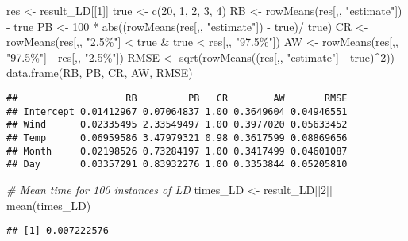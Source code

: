 \documentclass[
]{article}
\newenvironment{Shaded}{\begin{snugshade}}{\end{snugshade}}
\newcommand{\CommentTok}[1]{\textcolor[rgb]{0.56,0.35,0.01}{\textit{#1}}}
\newcommand{\DecValTok}[1]{\textcolor[rgb]{0.00,0.00,0.81}{#1}}
\newcommand{\FunctionTok}[1]{\textcolor[rgb]{0.00,0.00,0.00}{#1}}
\newcommand{\NormalTok}[1]{#1}
\newcommand{\OtherTok}[1]{\textcolor[rgb]{0.56,0.35,0.01}{#1}}
\newcommand{\SpecialCharTok}[1]{\textcolor[rgb]{0.00,0.00,0.00}{#1}}
\newcommand{\StringTok}[1]{\textcolor[rgb]{0.31,0.60,0.02}{#1}}
\begin{document}
\begin{Shaded}
\begin{Highlighting}[]
\NormalTok{res }\OtherTok{\textless{}{-}}\NormalTok{ result\_LD[[}\DecValTok{1}\NormalTok{]]}
\NormalTok{true }\OtherTok{\textless{}{-}} \FunctionTok{c}\NormalTok{(}\DecValTok{20}\NormalTok{, }\DecValTok{1}\NormalTok{, }\DecValTok{2}\NormalTok{, }\DecValTok{3}\NormalTok{, }\DecValTok{4}\NormalTok{)}
\NormalTok{RB }\OtherTok{\textless{}{-}} \FunctionTok{rowMeans}\NormalTok{(res[,, }\StringTok{"estimate"}\NormalTok{]) }\SpecialCharTok{{-}}\NormalTok{ true}
\NormalTok{PB }\OtherTok{\textless{}{-}} \DecValTok{100} \SpecialCharTok{*} \FunctionTok{abs}\NormalTok{((}\FunctionTok{rowMeans}\NormalTok{(res[,, }\StringTok{"estimate"}\NormalTok{]) }\SpecialCharTok{{-}}\NormalTok{ true)}\SpecialCharTok{/}\NormalTok{ true)}
\NormalTok{CR }\OtherTok{\textless{}{-}} \FunctionTok{rowMeans}\NormalTok{(res[,, }\StringTok{"2.5\%"}\NormalTok{] }\SpecialCharTok{\textless{}}\NormalTok{ true }\SpecialCharTok{\&}\NormalTok{ true }\SpecialCharTok{\textless{}}\NormalTok{ res[,, }\StringTok{"97.5\%"}\NormalTok{])}
\NormalTok{AW }\OtherTok{\textless{}{-}} \FunctionTok{rowMeans}\NormalTok{(res[,, }\StringTok{"97.5\%"}\NormalTok{] }\SpecialCharTok{{-}}\NormalTok{ res[,, }\StringTok{"2.5\%"}\NormalTok{])}
\NormalTok{RMSE }\OtherTok{\textless{}{-}} \FunctionTok{sqrt}\NormalTok{(}\FunctionTok{rowMeans}\NormalTok{((res[,, }\StringTok{"estimate"}\NormalTok{] }\SpecialCharTok{{-}}\NormalTok{ true)}\SpecialCharTok{\^{}}\DecValTok{2}\NormalTok{))}
\FunctionTok{data.frame}\NormalTok{(RB, PB, CR, AW, RMSE)}
\end{Highlighting}
\end{Shaded}

\begin{verbatim}
##                   RB         PB   CR        AW       RMSE
## Intercept 0.01412967 0.07064837 1.00 0.3649604 0.04946551
## Wind      0.02335495 2.33549497 1.00 0.3977020 0.05633452
## Temp      0.06959586 3.47979321 0.98 0.3617599 0.08869656
## Month     0.02198526 0.73284197 1.00 0.3417499 0.04601087
## Day       0.03357291 0.83932276 1.00 0.3353844 0.05205810
\end{verbatim}

\begin{Shaded}
\begin{Highlighting}[]
\CommentTok{\# Mean time for 100 instances of LD}
\NormalTok{times\_LD }\OtherTok{\textless{}{-}}\NormalTok{ result\_LD[[}\DecValTok{2}\NormalTok{]]}
\FunctionTok{mean}\NormalTok{(times\_LD)}
\end{Highlighting}
\end{Shaded}

\begin{verbatim}
## [1] 0.007222576
\end{verbatim}
\end{document}

